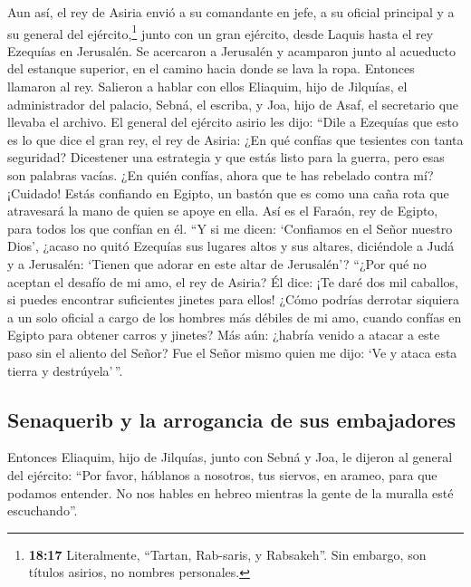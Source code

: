  Aun así, el rey de Asiria envió a su comandante en jefe,
a su oficial principal y a su general del ejército,\footnote{\textbf{18:17}
  Literalmente, ``Tartan, Rab-saris, y Rabsakeh''. Sin embargo, son
  títulos asirios, no nombres personales.} junto con un gran ejército,
desde Laquis hasta el rey Ezequías en Jerusalén. Se acercaron a
Jerusalén y acamparon junto al acueducto del estanque superior, en el
camino hacia donde se lava la ropa.  Entonces llamaron al
rey. Salieron a hablar con ellos Eliaquim, hijo de Jilquías, el
administrador del palacio, Sebná, el escriba, y Joa, hijo de Asaf, el
secretario que llevaba el archivo.  El general del
ejército asirio les dijo: ``Dile a Ezequías que esto es lo que dice el
gran rey, el rey de Asiria: ¿En qué confías que tesientes con tanta
seguridad?  Dicestener una estrategia y que estás listo
para la guerra, pero esas son palabras vacías. ¿En quién confías, ahora
que te has rebelado contra mí?  ¡Cuidado! Estás confiando
en Egipto, un bastón que es como una caña rota que atravesará la mano de
quien se apoye en ella. Así es el Faraón, rey de Egipto, para todos los
que confían en él.  ``Y si me dicen: `Confiamos en el
Señor nuestro Dios', ¿acaso no quitó Ezequías sus lugares altos y sus
altares, diciéndole a Judá y a Jerusalén: `Tienen que adorar en este
altar de Jerusalén'?  ``¿Por qué no aceptan el desafío de
mi amo, el rey de Asiria? Él dice: ¡Te daré dos mil caballos, si puedes
encontrar suficientes jinetes para ellos!  ¿Cómo podrías
derrotar siquiera a un solo oficial a cargo de los hombres más débiles
de mi amo, cuando confías en Egipto para obtener carros y jinetes?
 Más aún: ¿habría venido a atacar a este paso sin el
aliento del Señor? Fue el Señor mismo quien me dijo: `Ve y ataca esta
tierra y destrúyela'\,''.

\hypertarget{senaquerib-y-la-arrogancia-de-sus-embajadores}{%
\subsection{Senaquerib y la arrogancia de sus
embajadores}\label{senaquerib-y-la-arrogancia-de-sus-embajadores}}

 Entonces Eliaquim, hijo de Jilquías, junto con Sebná y
Joa, le dijeron al general del ejército: ``Por favor, háblanos a
nosotros, tus siervos, en arameo, para que podamos entender. No nos
hables en hebreo mientras la gente de la muralla esté escuchando''.


